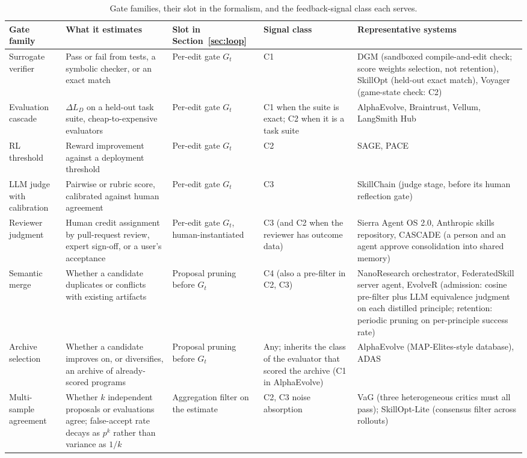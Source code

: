 \begin{table}[h]
\centering\small
\begin{tabular}{>{\raggedright\arraybackslash}p{}>{\raggedright\arraybackslash}p{}>{\raggedright\arraybackslash}p{}>{\raggedright\arraybackslash}p{}>{\raggedright\arraybackslash}p{}}
\toprule
Gate family & What it estimates & Slot in Section~\ref{sec:loop} & Signal class & Representative systems \\
\midrule
Surrogate verifier & Pass or fail from tests, a symbolic checker, or an exact match & Per-edit gate $G_t$ & C1 & DGM (sandboxed compile-and-edit check; score weights selection, not retention), SkillOpt (held-out exact match), Voyager (game-state check: C2) \\
Evaluation cascade & $\widehat{\Delta} L_D$ on a held-out task suite, cheap-to-expensive evaluators & Per-edit gate $G_t$ & C1 when the suite is exact; C2 when it is a task suite & AlphaEvolve, Braintrust, Vellum, LangSmith Hub \\
RL threshold & Reward improvement against a deployment threshold & Per-edit gate $G_t$ & C2 & SAGE, PACE \\
LLM judge with calibration & Pairwise or rubric score, calibrated against human agreement & Per-edit gate $G_t$ & C3 & SkillChain (judge stage, before its human reflection gate) \\
Reviewer judgment & Human credit assignment by pull-request review, expert sign-off, or a user's acceptance & Per-edit gate $G_t$, human-instantiated & C3 (and C2 when the reviewer has outcome data) & Sierra Agent OS 2.0, Anthropic skills repository, CASCADE (a person and an agent approve consolidation into shared memory) \\
Semantic merge & Whether a candidate duplicates or conflicts with existing artifacts & Proposal pruning before $G_t$ & C4 (also a pre-filter in C2, C3) & NanoResearch orchestrator, FederatedSkill server agent, EvolveR (admission: cosine pre-filter plus LLM equivalence judgment on each distilled principle; retention: periodic pruning on per-principle success rate) \\
Archive selection & Whether a candidate improves on, or diversifies, an archive of already-scored programs & Proposal pruning before $G_t$ & Any; inherits the class of the evaluator that scored the archive (C1 in AlphaEvolve) & AlphaEvolve (MAP-Elites-style database), ADAS \\
Multi-sample agreement & Whether $k$ independent proposals or evaluations agree; false-accept rate decays as $p^k$ rather than variance as $1/k$ & Aggregation filter on the estimate & C2, C3 noise absorption & VaG (three heterogeneous critics must all pass); SkillOpt-Lite (consensus filter across rollouts) \\
\bottomrule
\end{tabular}
\caption{Gate families, their slot in the formalism, and the feedback-signal class each serves.}
\label{tab:gatefamilies}
\end{table}


